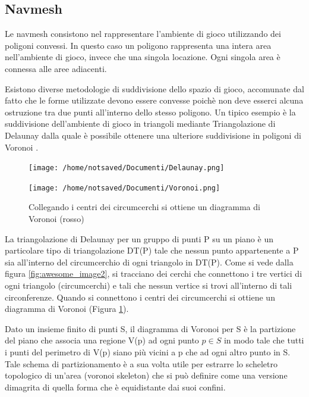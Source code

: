 \documentclass[12pt]{book}
\begin{document}
\subsection{Navmesh}
\par{Le navmesh consistono nel rappresentare l'ambiente di gioco utilizzando dei poligoni convessi. In questo caso un poligono rappresenta una intera area nell'ambiente di gioco, invece che una singola locazione. Ogni singola area \`e connessa alle aree adiacenti.}
\par{Esistono diverse metodologie di suddivisione dello spazio di gioco, accomunate dal fatto che le forme utilizzate devono essere convesse poich\`e non deve esserci alcuna ostruzione tra due punti all'interno dello stesso poligono. Un tipico esempio \`e la suddivisione dell'ambiente di gioco in triangoli mediante Triangolazione di Delaunay dalla quale \`e possibile ottenere una ulteriore suddivisione in poligoni di Voronoi .} 
\begin{figure}[htp]
  \texttt{[image: /home/notsaved/Documenti/Delaunay.png]}
  \caption{Triangolazione di Delaunay con tutti i circumcerchi e i loro centri (rosso)}\label{fig:awesome_image2}
\endminipage\hfill
{}%
  \texttt{[image: /home/notsaved/Documenti/Voronoi.png]}
  \caption{Collegando i centri dei circumcerchi si ottiene un diagramma di Voronoi (rosso)}\label{fig:awesome_image3}
\endminipage
\end{figure}
\par{La triangolazione di Delaunay per un gruppo di punti P su un piano \`e un particolare tipo di triangolazione DT(P) tale che nessun punto appartenente a P sia all'interno del circumcerchio di ogni triangolo in DT(P). Come si vede dalla figura \ref{fig:awesome_image2}, si tracciano dei cerchi che connettono i tre vertici di ogni triangolo (circumcerchi) e tali che nessun vertice si trovi all'interno di tali circonferenze. Quando si connettono i centri dei circumcerchi si ottiene un diagramma di Voronoi (Figura \ref{fig:awesome_image3}).}
\par{Dato un insieme finito di punti S, il diagramma di Voronoi per S \`e la partizione del piano che associa una regione V(p) ad ogni punto $p \in S$ in modo tale che tutti i punti del perimetro di V(p) siano pi\`u vicini a p che ad ogni altro punto in S. Tale schema di partizionamento \`e a sua volta utile per estrarre lo scheletro topologico di un'area (voronoi skeleton) che si pu\`o definire come una versione dimagrita di quella forma che \`e equidistante dai suoi confini.}
\end{document}
